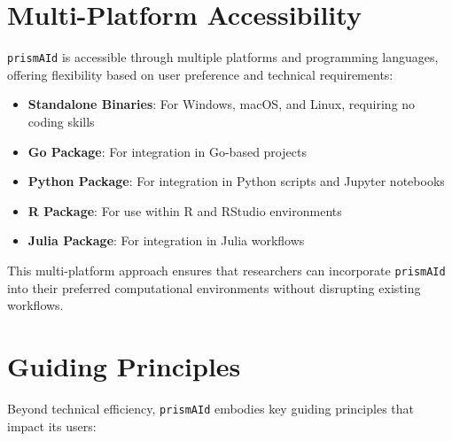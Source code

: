 \section{Multi-Platform Accessibility}

\texttt{prismAId} is accessible through multiple platforms and programming languages, offering flexibility based on user preference and technical requirements:

\begin{itemize}
    \item \textbf{Standalone Binaries}: For Windows, macOS, and Linux, requiring no coding skills
    \item \textbf{Go Package}: For integration in Go-based projects
    \item \textbf{Python Package}: For integration in Python scripts and Jupyter notebooks
    \item \textbf{R Package}: For use within R and RStudio environments
    \item \textbf{Julia Package}: For integration in Julia workflows
\end{itemize}

This multi-platform approach ensures that researchers can incorporate \texttt{prismAId} into their preferred computational environments without disrupting existing workflows.

\section{Guiding Principles}

Beyond technical efficiency, \texttt{prismAId} embodies key guiding principles that impact its users:

